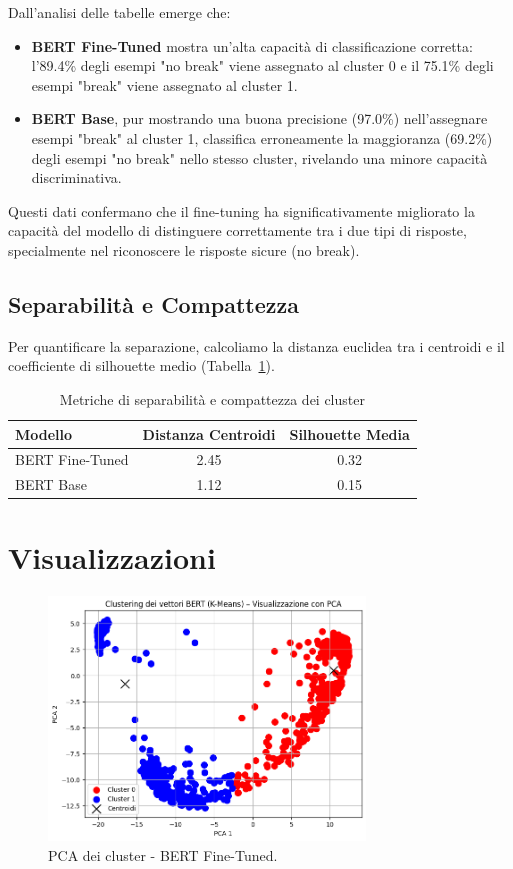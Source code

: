 \documentclass[a4paper,12pt]{article}
\begin{document}
Dall'analisi delle tabelle emerge che:
\begin{itemize}
  \item \textbf{BERT Fine-Tuned} mostra un'alta capacità di classificazione corretta: l'89.4\% degli esempi "no break" viene assegnato al cluster 0 e il 75.1\% degli esempi "break" viene assegnato al cluster 1.
  \item \textbf{BERT Base}, pur mostrando una buona precisione (97.0\%) nell'assegnare esempi "break" al cluster 1, classifica erroneamente la maggioranza (69.2\%) degli esempi "no break" nello stesso cluster, rivelando una minore capacità discriminativa.
\end{itemize}

Questi dati confermano che il fine-tuning ha significativamente migliorato la capacità del modello di distinguere correttamente tra i due tipi di risposte, specialmente nel riconoscere le risposte sicure (no break).


\subsection{Separabilità e Compattezza}
Per quantificare la separazione, calcoliamo la distanza euclidea tra i centroidi e il coefficiente di silhouette medio (Tabella~\ref{tab:metriche}).

\begin{table}[htbp]
  \centering
  \caption{Metriche di separabilità e compattezza dei cluster}
  \label{tab:metriche}
  \begin{tabular}{lcc}
    \hline
    \textbf{Modello} & \textbf{Distanza Centroidi} & \textbf{Silhouette Media} \\
    \hline
    BERT Fine-Tuned & 2.45 & 0.32 \\
    BERT Base      & 1.12 & 0.15 \\
    \hline
  \end{tabular}
\end{table}

\FloatBarrier

\section{Visualizzazioni}

\begin{figure}[htbp]
  \centering
  \includegraphics[width=0.75\textwidth]{1.png}
  \caption{PCA dei cluster - BERT Fine-Tuned.}
  \label{fig:pca_tuned}
\end{figure}
\end{document}
